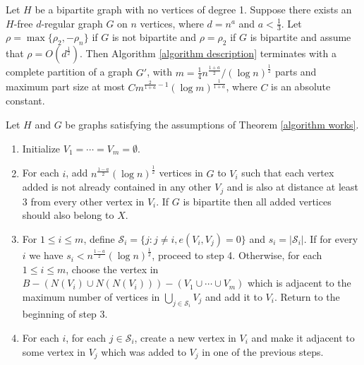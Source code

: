 \documentclass[10pt,a4paper]{amsart}
\begin{document}
\begin{theorem} \label{algorithm works}
    Let $H$ be a bipartite graph with no vertices of degree 1. Suppose there exists an $H$-free $d$-regular graph $G$ on $n$ vertices, where $d=n^a$ and $a<\frac{1}{3}$. Let $\rho = \max\{\rho_2, -\rho_n\}$ if $G$ is not bipartite and $\rho = \rho_2$ if $G$ is bipartite and assume that $\rho=O(d^\frac{1}{2})$. Then Algorithm \ref{algorithm description} terminates with a complete partition of a graph $G'$, with $m=\frac{1}{4}n^{\frac{1+a}{2}}/(\log n)^{\frac{1}{2}}$ parts and maximum part size at most $Cm^{\frac{2}{1+a}-1}(\log m)^{\frac{1}{1+a}}$, where $C$ is an absolute constant.
\end{theorem}

\begin{algorithm} \label{algorithm description} Let $H$ and $G$ be graphs satisfying the assumptions of Theorem \ref{algorithm works}.
    \begin{enumerate}
        \item Initialize $V_1=\cdots=V_m=\emptyset$.
        \item For each $i$, add $n^{\frac{1-a}{2}}(\log n)^{\frac{1}{2}}$ vertices in $G$ to $V_i$ such that each vertex added is not already contained in any other $V_j$ and is also at distance at least $3$ from every other vertex in $V_i$. If $G$ is bipartite then all added vertices should also belong to $X$.
        \item For $1\le i\le m$, define $\mathcal S_i=\{j:j\ne i,e(V_i,V_j)=0\}$ and $s_i=|\mathcal S_i|$. If for every $i$ we have $s_i<n^{\frac{1-a}{2}}(\log n)^{\frac{1}{2}}$, proceed to step 4. Otherwise, for each $1\le i\le m$, choose the vertex in $B-(N(V_i)\cup N(N(V_i)))-(V_1\cup\cdots\cup V_m)$ which is adjacent to the maximum number of vertices in $\bigcup_{j\in\mathcal S_i}V_j$ and add it to $V_i$. Return to the beginning of step 3.
        \item For each $i$, for each $j\in\mathcal S_i$, create a new vertex in $V_i$ and make it adjacent to some vertex in $V_j$ which was added to $V_j$ in one of the previous steps.
\end{enumerate}
\end{algorithm}
\end{document}
